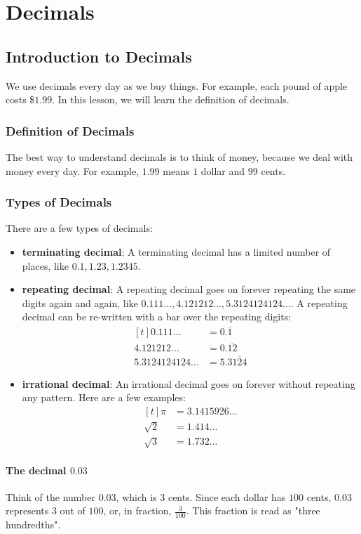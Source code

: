 
\chapter{Decimals}
\section{Introduction to Decimals}
\thispagestyle{fancy}

We use decimals every day as we buy things. For example, each pound of apple costs \$$1.99$. In this lesson, we will learn the definition of decimals.

\subsection{Definition of Decimals}
The best way to understand decimals is to think of money, because we deal with money every day. For example, $1.99$ means $1$ dollar and $99$ cents.

\subsection{Types of Decimals}
There are a few types of decimals:
\begin{itemize}
\item \textbf{terminating decimal}: A terminating decimal has a limited number of places, like $0.1,1.23,1.2345$.
\item \textbf{repeating decimal}: A repeating decimal goes on forever repeating the same digits again and again, like $0.111...,4.121212...,5.3124124124...$. A repeating decimal can be re-written with a bar over the repeating digits:
\[
\begin{aligned}[t]
	0.111... &= 0.\overline{1} \\
	4.121212... &= 0.\overline{12} \\
	5.3124124124... &= 5.3\overline{124} 
\end{aligned}
\]
\item \textbf{irrational decimal}: An irrational decimal goes on forever without repeating any pattern. Here are a few examples:
\[
\begin{aligned}[t]
	\pi &= 3.1415926... \\
	\sqrt{2} &= 1.414... \\
	\sqrt{3} &= 1.732...
\end{aligned}
\]
\end{itemize}

\subsubsection{The decimal $0.03$}
Think of the number $0.03$, which is $3$ cents. Since each dollar has $100$ cents, $0.03$ represents $3$ out of $100$, or, in fraction, $\frac{3}{100}$. This fraction is read as "three hundredths".

